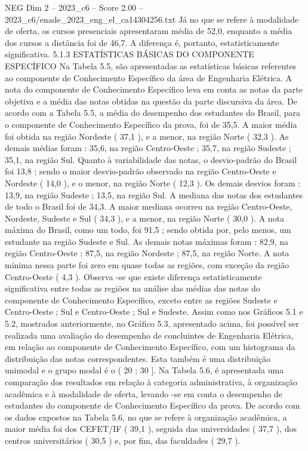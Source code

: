 \begin{textsample}{NEG Dim 2 – 2023\_c6 – Score 2.00 – 2023\_c6/enade\_2023\_eng\_el\_ca14304256.txt}
Já no que se refere à modalidade de oferta, os cursos presenciais apresentaram média de 52,0, enquanto a média dos cursos a distância foi de 46,7.
A diferença é, portanto, estatisticamente significativa. 5.1.3 ESTATÍSTICAS BÁSICAS DO COMPONENTE ESPECÍFICO Na Tabela 5.5, são apresentadas as estatísticas básicas referentes ao componente de Conhecimento Específico da área de Engenharia Elétrica.
A nota do componente de Conhecimento Específico leva em conta as notas da parte objetiva e a média das notas obtidas na questão da parte discursiva da área.
De acordo com a Tabela 5.5, a média do desempenho dos estudantes do Brasil, para o componente de Conhecimento Específico da prova, foi de 35,5.
A maior média foi obtida na região Nordeste ( 37,1 ), e a menor, na região Norte ( 32,3 ).
As demais médias foram : 35,6, na região Centro-Oeste ; 35,7, na região Sudeste ; 35,1, na região Sul.
Quanto à variabilidade das notas, o desvio-padrão do Brasil foi 13,8 ; sendo o maior desvio-padrão observado na região Centro-Oeste e Nordeste ( 14,0 ), e o menor, na região Norte ( 12,3 ).
Os demais desvios foram : 13,9, na região Sudeste ; 13,5, na região Sul.
A mediana das notas dos estudantes de todo o Brasil foi de 34,3.
A maior mediana ocorreu na região Centro-Oeste, Nordeste, Sudeste e Sul ( 34,3 ), e a menor, na região Norte ( 30,0 ).
A nota máxima do Brasil, como um todo, foi 91,5 ; sendo obtida por, pelo menos, um estudante na região Sudeste e Sul.
As demais notas máximas foram : 82,9, na região Centro-Oeste ; 87,5, na região Nordeste ; 87,5, na região Norte.
A nota mínima nessa parte foi zero em quase todas as regiões, com exceção da região Centro-Oeste ( 4,3 ).
Observa -se que existe diferença estatisticamente significativa entre todas as regiões na análise das médias das notas do componente de Conhecimento Específico, exceto entre as regiões Sudeste e Centro-Oeste ; Sul e Centro-Oeste ; Sul e Sudeste.
Assim como nos Gráficos 5.1 e 5.2, mostrados anteriormente, no Gráfico 5.3, apresentado acima, foi possível ser realizada uma avaliação do desempenho de concluintes de Engenharia Elétrica, em relação ao componente de Conhecimento Específico, com um histograma da distribuição das notas correspondentes.
Esta também é uma distribuição unimodal e o grupo modal é o ( 20 ; 30 ].
Na Tabela 5.6, é apresentada uma comparação dos resultados em relação à categoria administrativa, à organização acadêmica e à modalidade de oferta, levando -se em conta o desempenho de estudantes do componente de Conhecimento Específico da prova.
De acordo com os dados expostos na Tabela 5.6, no que se refere à organização acadêmica, a maior média foi dos CEFET/IF ( 39,1 ), seguida das universidades ( 37,7 ), dos centros universitários ( 30,5 ) e, por fim, das faculdades ( 29,7 ).

\end{textsample}
